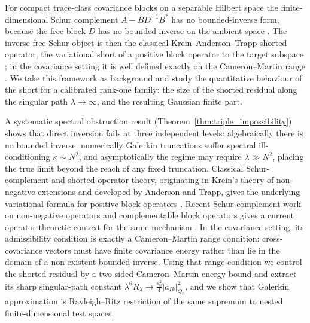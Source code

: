 \documentclass[preprint,12pt]{elsarticle}
\theoremstyle{plain}
\theoremstyle{definition}
\theoremstyle{remark}
\begin{document}
    For compact trace-class covariance blocks on a separable Hilbert space the
    finite-dimensional Schur complement $A-BD^{-1}B^*$ has no bounded-inverse
    form, because the free block $D$ has no bounded inverse on the ambient space
    \cite{bogachev1998gaussian,simon2005trace,daprato2014stochastic,jorgensentian2024hilbert}.
    The inverse-free Schur object is then the classical Krein--Anderson--Trapp
    shorted operator, the variational short of a positive block operator to the
    target subspace
    \cite{krein1947selfadjoint,anderson1975shorted,douglas1966majorization}; in
    the covariance setting it is well defined exactly on the Cameron--Martin
    range \cite{owhadi2015conditioning}.  We take this framework as background
    and study the quantitative behaviour of the short for a calibrated rank-one
    family: the size of the shorted residual along the singular path
    $\lambda\to\infty$, and the resulting Gaussian finite part.

    A systematic spectral obstruction result
    (Theorem~\ref{thm:triple_impossibility}) shows that direct inversion fails
    at three independent levels: algebraically there is no bounded inverse,
    numerically Galerkin truncations suffer spectral ill-conditioning
    $\kappa\sim N^{2}$, and asymptotically the regime may require
    $\lambda\gg N^{2}$, placing the true limit beyond the reach of any fixed
    truncation.  Classical Schur-complement and shorted-operator theory,
    originating in Krein's theory of non-negative extensions and developed by
    Anderson and Trapp, gives the underlying variational formula for positive
    block operators
    \cite{krein1947selfadjoint,anderson1975shorted,douglas1966majorization}.
    Recent Schur-complement work on non-negative operators and complementable
    block operators gives a current operator-theoretic context for the same
    mechanism \cite{contino2021matrix,naikjohnson2024complementable}.
    In the covariance setting, its admissibility condition is exactly a
    Cameron--Martin range condition: cross-covariance vectors must have finite
    covariance energy rather than lie in the domain of a non-existent bounded
    inverse.  Using that range condition we control the shorted residual by a
    two-sided Cameron--Martin energy bound and extract its sharp singular-path
    constant $\lambda^6R_\lambda\to\frac{\varepsilon_0^2}{4}|a_{Ik}|_{Q_0}^2$,
    and we show that Galerkin approximation is Rayleigh--Ritz restriction of the
    same supremum to nested finite-dimensional test spaces.
\end{document}
